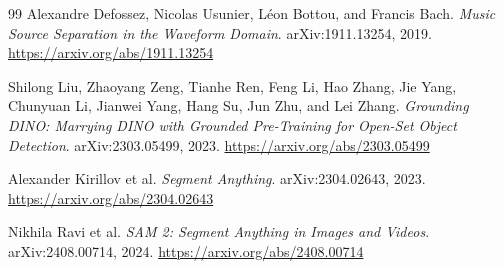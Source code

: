 \begin{thebibliography}{99}
Alexandre Defossez, Nicolas Usunier, Léon Bottou, and Francis Bach.
\textit{Music Source Separation in the Waveform Domain}.
arXiv:1911.13254, 2019.
\url{https://arxiv.org/abs/1911.13254}

Shilong Liu, Zhaoyang Zeng, Tianhe Ren, Feng Li, Hao Zhang, Jie Yang, Chunyuan Li, Jianwei Yang, Hang Su, Jun Zhu, and Lei Zhang.
\textit{Grounding DINO: Marrying DINO with Grounded Pre-Training for Open-Set Object Detection}.
arXiv:2303.05499, 2023.
\url{https://arxiv.org/abs/2303.05499}

Alexander Kirillov et al.
\textit{Segment Anything}.
arXiv:2304.02643, 2023.
\url{https://arxiv.org/abs/2304.02643}

Nikhila Ravi et al.
\textit{SAM 2: Segment Anything in Images and Videos}.
arXiv:2408.00714, 2024.
\url{https://arxiv.org/abs/2408.00714}

\end{thebibliography}
